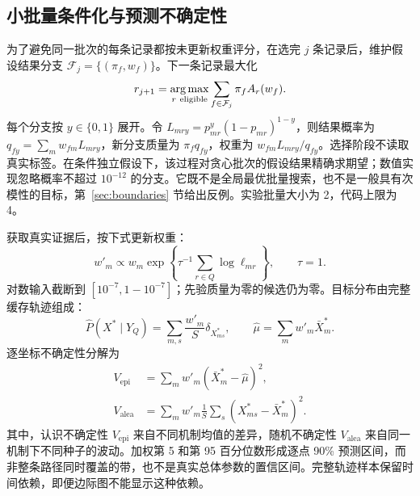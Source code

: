\subsection{小批量条件化与预测不确定性}
为了避免同一批次的每条记录都按未更新权重评分，在选完 $j$ 条记录后，维护假设结果分支 $\mathcal F_j=\{(\pi_f,w_f)\}$。下一条记录最大化
\begin{equation}
 r_{j+1}=\argmax_{r\ \mathrm{eligible}}\sum_{f\in\mathcal F_j}\pi_f A_r(w_f).
 \label{eq:batch}
\end{equation}
每个分支按 $y\in\{0,1\}$ 展开。令 $L_{mry}=p_{mr}^y(1-p_{mr})^{1-y}$，则结果概率为 $q_{fy}=\sum_mw_{fm}L_{mry}$，新分支质量为 $\pi_fq_{fy}$，权重为 $w_{fm}L_{mry}/q_{fy}$。选择阶段不读取真实标签。在条件独立假设下，该过程对贪心批次的假设结果精确求期望；数值实现忽略概率不超过 $10^{-12}$ 的分支。它既不是全局最优批量搜索，也不是一般具有次模性的目标，第~\ref{sec:boundaries} 节给出反例。实验批量大小为 2，代码上限为 4。

获取真实证据后，按下式更新权重：
\begin{equation}
 w'_m\propto w_m\exp\left\{\tau^{-1}\sum_{r\in Q}\log\ell_{mr}\right\},\qquad\tau=1.
 \label{eq:update}
\end{equation}
对数输入截断到 $[10^{-7},1-10^{-7}]$；先验质量为零的候选仍为零。目标分布由完整缓存轨迹组成：
\begin{equation}
 \widehat P(X^*\mid Y_Q)=\sum_{m,s}\frac{w'_m}{S}\delta_{X^*_{ms}},
 \qquad\widehat\mu=\sum_mw'_m\bar X^*_m.
 \label{eq:mixture}
\end{equation}
逐坐标不确定性分解为
\begin{align}
 V_{\mathrm{epi}}&=\sum_mw'_m(\bar X^*_m-\widehat\mu)^2,\nonumber\\
 V_{\mathrm{alea}}&=\sum_mw'_m\frac1S\sum_s(X^*_{ms}-\bar X^*_m)^2.
 \label{eq:uncertainty}
\end{align}
其中，认识不确定性 $V_{\mathrm{epi}}$ 来自不同机制均值的差异，随机不确定性 $V_{\mathrm{alea}}$ 来自同一机制下不同种子的波动。加权第 5 和第 95 百分位数形成逐点 90\% 预测区间，而非整条路径同时覆盖的带，也不是真实总体参数的置信区间。完整轨迹样本保留时间依赖，即便边际图不能显示这种依赖。

